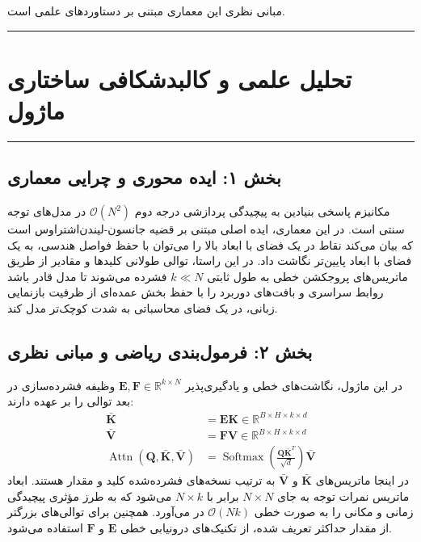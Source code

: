 \clearpage
{}
\vspace*{0.2cm}

مبانی نظری این معماری مبتنی بر دستاوردهای علمی \cite{wang2020linformer} است.
\noindent\rule{\textwidth}{1.2pt}
\vspace*{0.1cm}
\section{تحلیل علمی و کالبدشکافی ساختاری ماژول }
\label{sec:mod_linformer_attention}
\vspace*{-0.2cm}
\noindent\rule{\textwidth}{0.5pt}
\vspace*{0.3cm}

\subsection*{بخش ۱: ایده محوری و چرایی معماری }
مکانیزم  پاسخی بنیادین به پیچیدگی پردازشی درجه دوم $\mathcal{O}(N^2)$ در مدل‌های توجه سنتی است. در این معماری، ایده اصلی مبتنی بر قضیه جانسون-لیندن‌اشتراوس  است که بیان می‌کند نقاط در یک فضای با ابعاد بالا را می‌توان با حفظ فواصل هندسی، به یک فضای با ابعاد پایین‌تر نگاشت داد. در این راستا، توالی طولانی کلیدها و مقادیر از طریق ماتریس‌های پروجکشن خطی به طول ثابتی $k \ll N$ فشرده می‌شوند تا مدل قادر باشد روابط سراسری و بافت‌های دوربرد را با حفظ بخش عمده‌ای از ظرفیت بازنمایی زبانی، در یک فضای محاسباتی به شدت کوچک‌تر مدل کند.

\subsection*{بخش ۲: فرمول‌بندی ریاضی و مبانی نظری }
در این ماژول، نگاشت‌های خطی و یادگیری‌پذیر $\mathbf{E}, \mathbf{F} \in \mathbb{R}^{k \times N}$ وظیفه فشرده‌سازی در بعد توالی را بر عهده دارند:
\begin{align}
\bar{\mathbf{K}} &= \mathbf{E} \mathbf{K} \in \mathbb{R}^{B \times H \times k \times d} \\
\bar{\mathbf{V}} &= \mathbf{F} \mathbf{V} \in \mathbb{R}^{B \times H \times k \times d} \\
\operatorname{Attn}(\mathbf{Q}, \bar{\mathbf{K}}, \bar{\mathbf{V}}) &= \operatorname{Softmax}\left(\frac{\mathbf{Q} \bar{\mathbf{K}}^T}{\sqrt{d}}\right) \bar{\mathbf{V}}
\end{align}
در اینجا ماتریس‌های $\bar{\mathbf{K}}$ و $\bar{\mathbf{V}}$ به ترتیب نسخه‌های فشرده‌شده کلید و مقدار هستند. ابعاد ماتریس نمرات توجه به جای $N \times N$ برابر با $N \times k$ می‌شود که به طرز مؤثری پیچیدگی زمانی و مکانی را به صورت خطی $\mathcal{O}(N k)$ در می‌آورد. همچنین برای توالی‌های بزرگتر از مقدار حداکثر تعریف شده، از تکنیک‌های درونیابی خطی $\mathbf{E}$ و $\mathbf{F}$ استفاده می‌شود.

